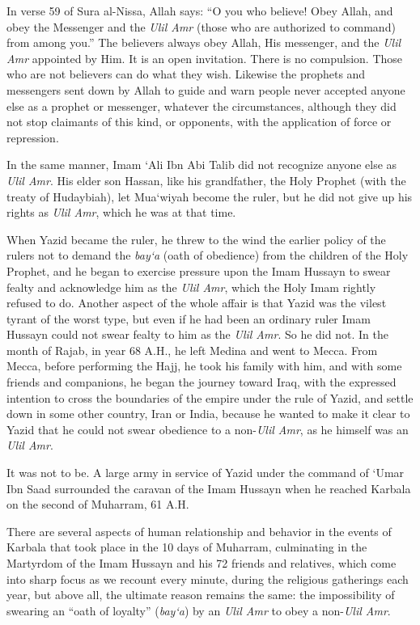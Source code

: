 In verse 59 of Sura al-Nissa, Allah says: ``O you who believe! Obey Allah, and obey the Messenger and the \emph{Ulil Amr} (those who are authorized to command) from among you.'' The believers always obey Allah, His messenger, and the \emph{Ulil Amr} appointed by Him. It is an open invitation. There is no compulsion. Those who are not believers can do what they wish. Likewise the prophets and messengers sent down by Allah to guide and warn people never accepted anyone else as a prophet or messenger, whatever the circumstances, although they did not stop claimants of this kind, or opponents, with the application of force or repression.

In the same manner, Imam `Ali Ibn Abi Talib did not recognize anyone else as \emph{Ulil Amr}. His elder son Hassan, like his grandfather, the Holy Prophet (with the treaty of Hudaybiah), let Mua`wiyah become the ruler, but he did not give up his rights as \emph{Ulil Amr}, which he was at that time.

When Yazid became the ruler, he threw to the wind the earlier policy of the rulers not to demand the \emph{bay`a} (oath of obedience) from the children of the Holy Prophet, and he began to exercise pressure upon the Imam Hussayn to swear fealty and acknowledge him as the \emph{Ulil Amr}, which the Holy Imam rightly refused to do. Another aspect of the whole affair is that Yazid was the vilest tyrant of the worst type, but even if he had been an ordinary ruler Imam Hussayn could not swear fealty to him as the \emph{Ulil Amr}. So he did not. In the month of Rajab, in year 68 A.H., he left Medina and went to Mecca. From Mecca, before performing the Hajj, he took his family with him, and with some friends and companions, he began the journey toward Iraq, with the expressed intention to cross the boundaries of the empire under the rule of Yazid, and settle down in some other country, Iran or India, because he wanted to make it clear to Yazid that he could not swear obedience to a non-\emph{Ulil Amr}, as he himself was an \emph{Ulil Amr}.

It was not to be. A large army in service of Yazid under the command of `Umar Ibn Saad surrounded the caravan of the Imam Hussayn when he reached Karbala on the second of Muharram, 61 A.H.

There are several aspects of human relationship and behavior in the events of Karbala that took place in the 10 days of Muharram, culminating in the Martyrdom of the Imam Hussayn and his 72 friends and relatives, which come into sharp focus as we recount every minute, during the religious gatherings each year, but above all, the ultimate reason remains the same: the impossibility of swearing an ``oath of loyalty'' (\emph{bay`a}) by an \emph{Ulil Amr} to obey a non-\emph{Ulil Amr}.

